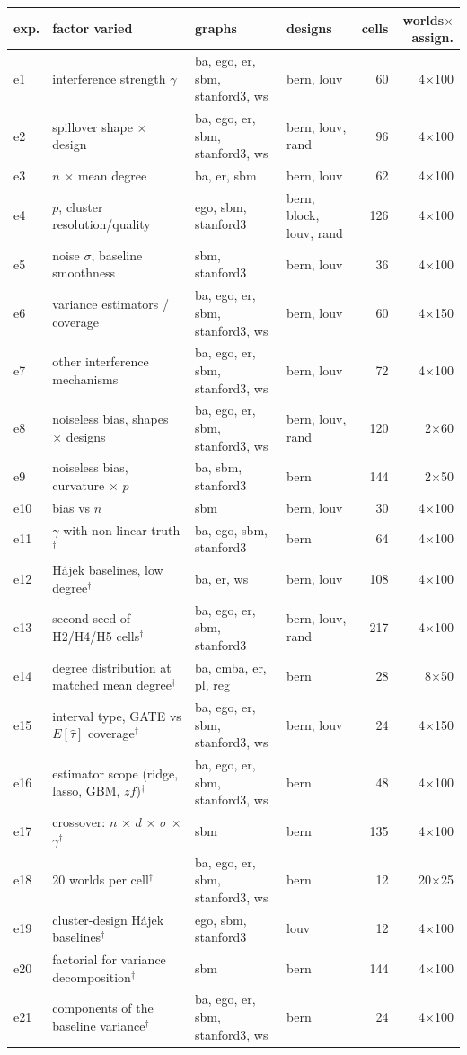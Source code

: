 \begin{tabular}{llllrr}
\toprule
exp. & factor varied & graphs & designs & cells & worlds$\times$assign. \\
\midrule
e1 & interference strength $\gamma$ & ba, ego, er, sbm, stanford3, ws & bern, louv & 60 & 4$\times$100 \\
e2 & spillover shape $\times$ design & ba, ego, er, sbm, stanford3, ws & bern, louv, rand & 96 & 4$\times$100 \\
e3 & $n$ $\times$ mean degree & ba, er, sbm & bern, louv & 62 & 4$\times$100 \\
e4 & $p$, cluster resolution/quality & ego, sbm, stanford3 & bern, block, louv, rand & 126 & 4$\times$100 \\
e5 & noise $\sigma$, baseline smoothness & sbm, stanford3 & bern, louv & 36 & 4$\times$100 \\
e6 & variance estimators / coverage & ba, ego, er, sbm, stanford3, ws & bern, louv & 60 & 4$\times$150 \\
e7 & other interference mechanisms & ba, ego, er, sbm, stanford3, ws & bern, louv & 72 & 4$\times$100 \\
e8 & noiseless bias, shapes $\times$ designs & ba, ego, er, sbm, stanford3, ws & bern, louv, rand & 120 & 2$\times$60 \\
e9 & noiseless bias, curvature $\times$ $p$ & ba, sbm, stanford3 & bern & 144 & 2$\times$50 \\
e10 & bias vs $n$ & sbm & bern, louv & 30 & 4$\times$100 \\
e11 & $\gamma$ with non-linear truth$^\dagger$ & ba, ego, sbm, stanford3 & bern & 64 & 4$\times$100 \\
e12 & Hájek baselines, low degree$^\dagger$ & ba, er, ws & bern, louv & 108 & 4$\times$100 \\
e13 & second seed of H2/H4/H5 cells$^\dagger$ & ba, ego, er, sbm, stanford3 & bern, louv, rand & 217 & 4$\times$100 \\
e14 & degree distribution at matched mean degree$^\dagger$ & ba, cmba, er, pl, reg & bern & 28 & 8$\times$50 \\
e15 & interval type, GATE vs $E[\hat\tau]$ coverage$^\dagger$ & ba, ego, er, sbm, stanford3, ws & bern, louv & 24 & 4$\times$150 \\
e16 & estimator scope (ridge, lasso, GBM, $zf$)$^\dagger$ & ba, ego, er, sbm, stanford3, ws & bern & 48 & 4$\times$100 \\
e17 & crossover: $n$ $\times$ $d$ $\times$ $\sigma$ $\times$ $\gamma$$^\dagger$ & sbm & bern & 135 & 4$\times$100 \\
e18 & 20 worlds per cell$^\dagger$ & ba, ego, er, sbm, stanford3, ws & bern & 12 & 20$\times$25 \\
e19 & cluster-design Hájek baselines$^\dagger$ & ego, sbm, stanford3 & louv & 12 & 4$\times$100 \\
e20 & factorial for variance decomposition$^\dagger$ & sbm & bern & 144 & 4$\times$100 \\
e21 & components of the baseline variance$^\dagger$ & ba, ego, er, sbm, stanford3, ws & bern & 24 & 4$\times$100 \\
\bottomrule
\end{tabular}
